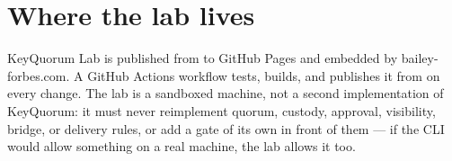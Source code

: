 \newcommand{\KqDocTitle}{KeyQuorum Lab}
\newcommand{\KqDocSubtitle}{Browser GUI Manual}
\newcommand{\KqHeaderTitle}{KeyQuorum Lab Manual}
\newcommand{\KqDocDescription}{%
A guide to KeyQuorum Lab's own browser interface: its header and tabs, and
the guided, gated tutorials built into the page. For the
\code{keyquorum} / \code{keyquorum-device} command-line tool the lab runs
underneath, see the separate KeyQuorum manual.
}



\KqTitlePage
\KqContents





\section{Where the lab lives}

KeyQuorum Lab is published from  to GitHub Pages and embedded by
bailey-forbes.com. A GitHub Actions workflow tests, builds, and publishes
it from  on every change. The lab is a sandboxed machine, not a
second implementation of KeyQuorum: it must never reimplement quorum,
custody, approval, visibility, bridge, or delivery rules, or add a gate of
its own in front of them --- if the CLI would allow something on a real
machine, the lab allows it too.


